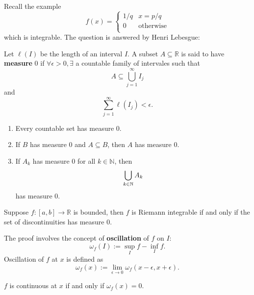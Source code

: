 Recall the example 
\[
    f(x) = \begin{cases}
    1/q &x=p/q\\
    0 &\text{otherwise}\\
    \end{cases} 
\]
which is integrable. The question is answered by Henri Lebesgue:
\begin{definition}
    Let $ \ell (I) $ be the length of an interval $I$. A subset $A \subseteq \mathbb{R}$ is said to have \textbf{measure} 0 if $ \forall \epsilon>0, \exists  $ a countable family of intervales such that 
    \[
        A \subseteq \bigcup_{j=1}^{\infty}I_j
    \]
    and 
    \[
        \sum_{j=1}^{\infty}\ell (I_j)<\epsilon.
    \]
\end{definition}
\begin{lemma}
    \begin{enumerate}
        \item Every countable set has measure 0.
        \item If $B$ has measure 0 and $ A \subseteq B $, then $A$ has measure 0.
        \item If $A_k$ has measure 0 for all $ k\in \mathbb{N} $, then 
        \[
            \bigcup_{k\in {\mathbb{N}}} A_k
        \]
        has measure 0.
    \end{enumerate}
\end{lemma}
\begin{theorem}
    Suppose $ f:[a,b]\to \mathbb{R} $ is bounded, then $f$ is Riemann integrable if and only if the set of discontinuities has measure 0.
\end{theorem}
The proof involves the concept of \textbf{oscillation} of $f$ on $I$:
\[
    \omega_f(I) := \sup_I f-\inf _I f.
\]
Oscillation of $f$ at $x$ is defined as 
\[
    \omega_f(x):=\lim_{\epsilon \to 0} \omega_f(x-\epsilon,x+\epsilon).
\]
\begin{lemma}
    $f$ is continuous at $x$ if and only if $ \omega_f(x)=0 $.
\end{lemma}

